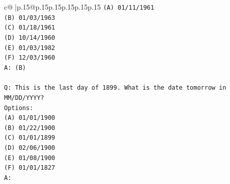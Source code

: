 \documentclass{article}
\begin{document}
{\begin{supertabular}{c@{$\;$}|p{.15\linewidth}@{}p{.15\linewidth}p{.15\linewidth}p{.15\linewidth}p{.15\linewidth}p{.15\linewidth}}
{{{\texttt{(A) 01/11/1961} \\
\texttt{(B) 01/03/1963} \\
\texttt{(C) 01/18/1961} \\
\texttt{(D) 10/14/1960} \\
\texttt{(E) 01/03/1982} \\
\texttt{(F) 12/03/1960} \\
\texttt{A: (B)} \\
\\ 
\texttt{Q: This is the last day of 1899. What is the date tomorrow in MM/DD/YYYY?} \\
\texttt{Options:} \\
\texttt{(A) 01/01/1900} \\
\texttt{(B) 01/22/1900} \\
\texttt{(C) 01/01/1899} \\
\texttt{(D) 02/06/1900} \\
\texttt{(E) 01/08/1900} \\
\texttt{(F) 01/01/1827} \\
\texttt{A:} \\
            }
        }
    }
     \\ \\


\end{supertabular}}
\end{document}

